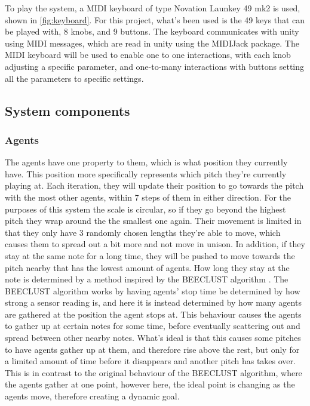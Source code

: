 \documentclass[a4paper,english]{report}
\begin{document}
	To play the system, a MIDI keyboard of type Novation Launkey 49 mk2 is used, shown in \ref{fig:keyboard}. For this project, what's been used is the 49 keys that can be played with, 8 knobs, and 9 buttons. The keyboard communicates with unity using MIDI messages, which are read in unity using the MIDIJack package. The MIDI keyboard will be used to enable one to one interactions, with each knob adjusting a specific parameter, and one-to-many interactions with buttons setting all the parameters to specific settings.
	\subsection{System components}
	\subsubsection{Agents}
	The agents have one property to them, which is what position they currently have. This position more specifically represents which pitch they're currently playing at. Each iteration, they will update their position to go towards the pitch with the most other agents, within 7 steps of them in either direction. For the purposes of this system the scale is circular, so if they go beyond the highest pitch they wrap around the the smallest one again. Their movement is limited in that they only have 3 randomly chosen lengths they're able to move, which causes them to spread out a bit more and not move in unison. In addition, if they stay at the same note for a long time, they will be pushed to move towards the pitch nearby that has the lowest amount of agents. How long they stay at the note is determined by a method inspired by the BEECLUST algorithm \cite{schmickl2011beeclust}. The BEECLUST algorithm works by having agents' stop time be determined by how strong a sensor reading is, and here it is instead determined by how many agents are gathered at the position the agent stops at. This behaviour causes the agents to gather up at certain notes for some time, before eventually scattering out and spread between other nearby notes. What's ideal is that this causes some pitches to have agents gather up at them, and therefore rise above the rest, but only for a limited amount of time before it disappears and another pitch has takes over. This is in contrast to the original behaviour of the BEECLUST algorithm, where the agents gather at one point, however here, the ideal point is changing as the agents move, therefore creating a dynamic goal.
	
\end{document}
